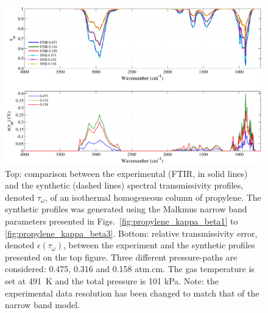 \begin{figure}[p]
\includegraphics[width=\textwidth]{Figures/Comparison_Fit_Propylene_MALKMUS_Temp491K.pdf}
\caption{Top: comparison between the experimental (FTIR, in solid lines) and the synthetic (dashed lines) spectral transmissivity profiles, denoted $\tau_{\omega}$, of an isothermal homogeneous column of propylene. The synthetic profiles was generated using the Malkmus narrow band parameters presented in Figs.~\ref{fig:propylene_kappa_beta1} to \ref{fig:propylene_kappa_beta3}. Bottom: relative transmissivity error, denoted $\epsilon{(\tau_{\omega})}$, between the experiment and the synthetic profiles presented on the top figure. Three different pressure-paths are considered: 0.475, 0.316 and 0.158 atm.cm. The gas temperature is set at 491~K and the total pressure is 101 kPa. Note: the experimental data resolution has been changed to match that of the narrow band model. \label{fig:propylene_SNBVerify_491K}}
\end{figure}

